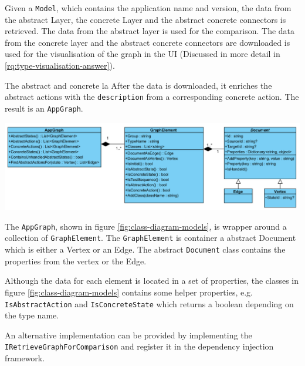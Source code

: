  \label{sec:the-graph-service}

Given a \verb|Model|, which contains the application name and version, the data from the abstract Layer, the concrete Layer and the abstract concrete connectors is retrieved. The data from the abstract layer is used for the comparison. The data from the concrete layer and the abstract concrete connectors are downloaded is used for the visualisation of the graph in the UI (Discussed in more detail in \ref{rq:type-visualisation-answer}). 

The abstract and concrete la After the data is downloaded, it enriches the abstract actions with the \verb|description| from a corresponding concrete action. The result is an \verb|AppGraph|.

\begingroup
\captionsetup{type=figure}
\includegraphics[scale=0.6]{images/4-UML-Models.png}
\label{fig:class-diagram-models}
\endgroup

The \verb|AppGraph|, shown in figure \ref{fig:class-diagram-models}, is wrapper around a collection of \verb|GraphElement|. The \verb|GraphElement| is container a abstract Document which is either a Vertex or an Edge. The abstract \verb|Document| class contains the properties from the vertex or the Edge.


Although the data for each element is located in a set of properties, the classes in figure \ref{fig:class-diagram-models} contains some helper properties, e.g. \verb|IsAbstractAction| and \verb|IsConcreteState| which returns a boolean depending on the type name. 

An alternative implementation can be provided by implementing the \verb|IRetrieveGraphForComparison| and register it in the dependency injection framework.

